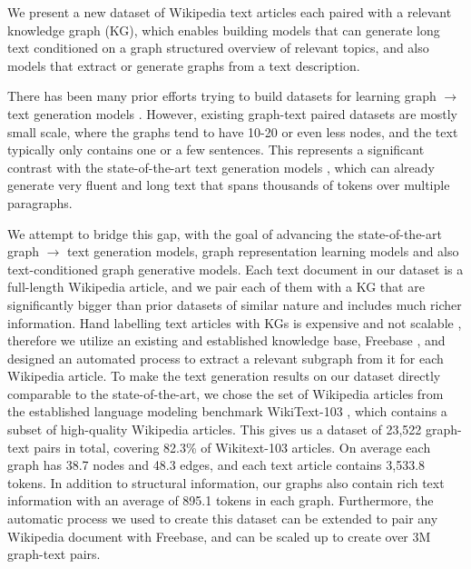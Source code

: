 \documentclass[11pt]{article}
\begin{document}
We present a new dataset of Wikipedia text articles each paired with a relevant knowledge graph (KG),
which enables building models that can generate long text conditioned on a graph structured overview of relevant topics,  and also models that extract or generate graphs from a text description.


There has been many prior efforts trying to build datasets for learning graph $\rightarrow$ text generation models \cite{jin-etal-2020-genwiki, gardent-etal-2017-webnlg, lebret-etal-2016-neural}.
However, existing graph-text paired datasets are mostly small scale, where the graphs tend to have 10-20 or even less nodes, and the text typically only contains one or a few sentences.  This represents a significant contrast with the state-of-the-art text generation models \cite{dai2019transformer,brown2020language}, which can already generate very fluent and long text that spans thousands of tokens over multiple paragraphs.

We attempt to bridge this gap, with the goal of advancing the state-of-the-art graph $\rightarrow$ text generation models, graph representation learning models and also text-conditioned graph generative models.  Each text document in our dataset is a full-length Wikipedia article, and we pair each of them with a KG that are significantly bigger than prior datasets of similar nature and includes much richer information.  Hand labelling text articles with KGs is expensive and not scalable \cite{jin-etal-2020-genwiki},
therefore we utilize an existing and established knowledge base, Freebase \cite{bollacker2008freebase}, and designed an automated process to extract a relevant subgraph from it for each Wikipedia article. To make the text generation results on our dataset directly comparable to the state-of-the-art, we chose the set of Wikipedia articles from the established language modeling
benchmark WikiText-103 \cite{merity2016pointer}, which contains a subset of high-quality Wikipedia articles.  This gives us a dataset of 23,522 graph-text pairs in total, covering 82.3\% of Wikitext-103 articles. On average each graph has 38.7 nodes and 48.3 edges, and each text article contains 3,533.8 tokens.
In addition to structural information, our graphs also contain rich text information with an average of 895.1 tokens in each graph.  Furthermore, the automatic process we used to create this dataset can be extended to pair any Wikipedia document with Freebase, and can be scaled up to create over 3M graph-text pairs.
\end{document}
